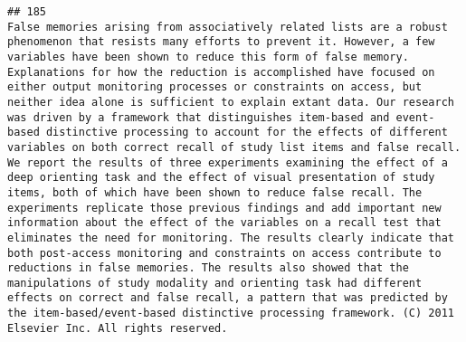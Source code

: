 \documentclass[
  english,
  man]{apa6}
\begin{document}
\begin{verbatim}
## 185                                                                                                                                                                                                                                                                                                                                                                                                                                                                                                                                                                                                                                                                                                                                                                                                                                                                                                                                                                                                                                                                                                                                                                                                                                  False memories arising from associatively related lists are a robust phenomenon that resists many efforts to prevent it. However, a few variables have been shown to reduce this form of false memory. Explanations for how the reduction is accomplished have focused on either output monitoring processes or constraints on access, but neither idea alone is sufficient to explain extant data. Our research was driven by a framework that distinguishes item-based and event-based distinctive processing to account for the effects of different variables on both correct recall of study list items and false recall. We report the results of three experiments examining the effect of a deep orienting task and the effect of visual presentation of study items, both of which have been shown to reduce false recall. The experiments replicate those previous findings and add important new information about the effect of the variables on a recall test that eliminates the need for monitoring. The results clearly indicate that both post-access monitoring and constraints on access contribute to reductions in false memories. The results also showed that the manipulations of study modality and orienting task had different effects on correct and false recall, a pattern that was predicted by the item-based/event-based distinctive processing framework. (C) 2011 Elsevier Inc. All rights reserved.

\end{verbatim}
\end{document}
